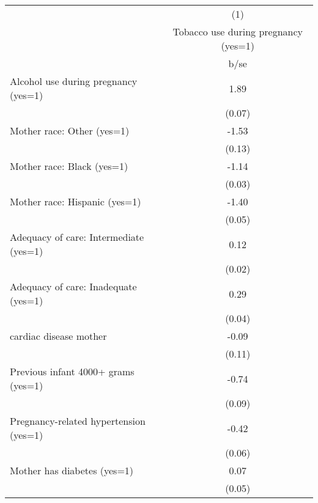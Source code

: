 {
\def\sym#1{\ifmmode^{#1}\else\(^{#1}\)\fi}
\begin{tabular}{l*{1}{c}}
\hline\hline
                                                  &\multicolumn{1}{c}{(1)}\\
                                                  &\multicolumn{1}{c}{Tobacco use during pregnancy (yes=1)}\\
                                                  &        b/se\\
\hline
Alcohol use during pregnancy (yes=1)              &        1.89\\
                                                  &      (0.07)\\
Mother race: Other (yes=1)                        &       -1.53\\
                                                  &      (0.13)\\
Mother race: Black (yes=1)                        &       -1.14\\
                                                  &      (0.03)\\
Mother race: Hispanic (yes=1)                     &       -1.40\\
                                                  &      (0.05)\\
Adequacy of care: Intermediate (yes=1)            &        0.12\\
                                                  &      (0.02)\\
Adequacy of care: Inadequate (yes=1)              &        0.29\\
                                                  &      (0.04)\\
cardiac disease mother                            &       -0.09\\
                                                  &      (0.11)\\
Previous infant 4000+ grams (yes=1)               &       -0.74\\
                                                  &      (0.09)\\
Pregnancy-related hypertension (yes=1)            &       -0.42\\
                                                  &      (0.06)\\
Mother has diabetes (yes=1)                       &        0.07\\
                                                  &      (0.05)\\

\end{tabular}}
